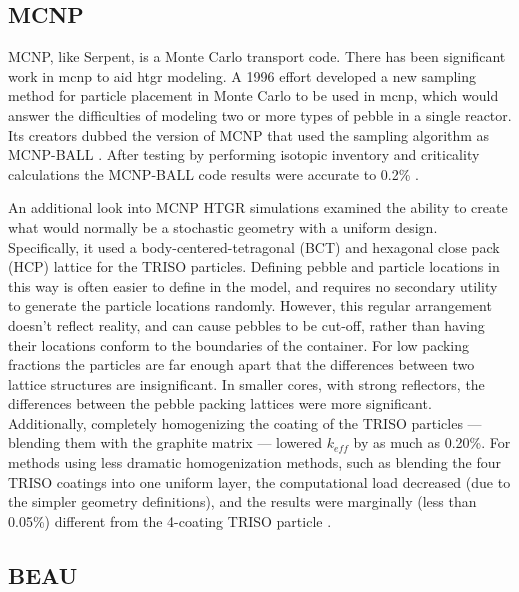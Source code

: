 \subsection{MCNP}
\label{sec:mcnp-beau}

MCNP, like Serpent, is a Monte Carlo transport code. There has been significant work in \acrshort{mcnp} to aid \acrshort{htgr} modeling.  A 1996 effort developed a new sampling method for particle placement in Monte Carlo to be used in \acrshort{mcnp}, which would answer the difficulties of modeling two or more types of pebble in a single reactor.  Its creators dubbed the version of MCNP that used the sampling algorithm as MCNP-BALL \cite{murata_new_1997}.  After testing by performing isotopic inventory and criticality calculations the MCNP-BALL code results were accurate to 0.2\% \cite{murata_new_1997}.

An additional look into MCNP HTGR simulations examined the ability to create what would normally be a stochastic geometry with a uniform design.  Specifically, it used a body-centered-tetragonal (BCT) and hexagonal close pack (HCP) lattice for the TRISO particles.  Defining pebble and particle locations in this way is often easier to define in the model, and requires no secondary utility to generate the particle locations randomly.  However, this regular arrangement doesn't reflect reality, and can cause pebbles to be cut-off, rather than having their locations conform to the boundaries of the container.  For low packing fractions the particles are far enough apart that the differences between two lattice structures are insignificant.  In smaller cores, with strong reflectors, the differences between the pebble packing lattices were more significant.  Additionally, completely homogenizing the coating of the TRISO particles --- blending them with the graphite matrix --- lowered $k_{eff}$ by as much as 0.20\%.  For methods using less dramatic homogenization methods, such as blending the four TRISO coatings into one uniform layer, the computational load decreased (due to the simpler geometry definitions), and the results were marginally (less than 0.05\%) different from the 4-coating TRISO particle \cite{karriem_mcnp_2001}.

\subsection{BEAU}

